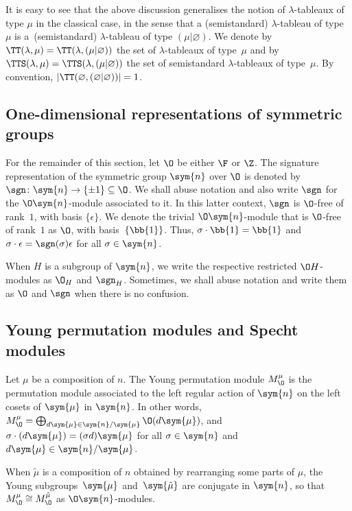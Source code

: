It is easy to see that the above discussion generalises the notion of $\lambda$-tableaux of type $\mu$ in the classical case, in the sense that a (semistandard) $\lambda$-tableau of type~$\mu$ is a~(semistandard) $\lambda$-tableau of type $(\mu|\varnothing)$. We denote by $\TT(\lambda,\mu)=\TT(\lambda,(\mu|\varnothing))$ the set of $\lambda$-tableaux of type~$\mu$ and by $\TTS(\lambda,\mu)=\TTS(\lambda,(\mu|\varnothing))$ the set of semistandard $\lambda$-tableaux of type~$\mu$. By convention, $|\TT(\varnothing,(\varnothing|\varnothing))|=1$.


\subsection{One-dimensional representations of symmetric groups}

For the remainder of this section, let $\O$ be either $\F$ or $\Z$. The signature representation of the symmetric group $\sym{n}$ over $\O$ is denoted by $\sgn \colon \sym{n} \to \{ \pm 1 \} \subseteq \O$. We shall abuse notation and also write $\sgn$ for the $\O\sym{n}$-module associated to it. In this latter context, $\sgn$ is $\O$-free of rank~$1$, with basis $\{\epsilon\}$. We denote the trivial $\O\sym{n}$-module that is $\O$-free of rank~$1$ as $\O$, with basis~$\{\bb{1}\}$. Thus, $\sigma \cdot \bb{1} = \bb{1}$ and $\sigma \cdot \epsilon = \sgn(\sigma) \epsilon$ for all $\sigma \in \sym{n}$.

When $H$ is a subgroup of $\sym{n}$, we write the respective restricted $\O H$-modules as $\O_{H}$ and $\sgn_H$. Sometimes, we shall abuse notation and write them as $\O$ and $\sgn$ when there is no confusion.

\subsection{Young permutation modules and Specht modules}

Let $\mu$ be a composition of $n$. The Young permutation module $M^{\mu}_{\O}$ is the permutation module associated to the left regular action of $\sym{n}$ on the left cosets of $\sym{\mu}$ in $\sym{n}$. In other words, $M^{\mu}_{\O} = \bigoplus_{d \sym{\mu} \in \sym{n}/\sym{\mu}} \O (d\sym{\mu})$, and $\sigma \cdot (d \sym{\mu}) = (\sigma d )\sym{\mu}$ for all $\sigma \in \sym{n}$ and $d\sym{\mu} \in \sym{n}/\sym{\mu}$.

When $\tilde{\mu}$ is a composition of $n$ obtained by rearranging some parts of $\mu$, the Young sub\-groups~$\sym{\mu}$ and~$\sym{\tilde{\mu}}$ are conjugate in $\sym{n}$, so that $M^{\mu}_{\O} \cong M^{\tilde{\mu}}_{\O}$ as $\O\sym{n}$-modules.

